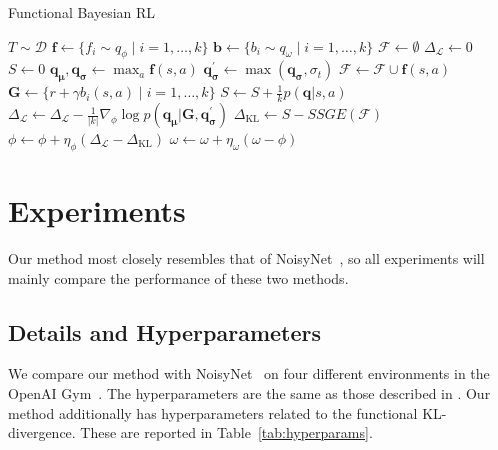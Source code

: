 \documentclass[]{uai2021} %
\newcommand{\D}{\mathcal{D}}
\newcommand{\f}{\mathbf{f}}
\newcommand{\KL}{\mathrm{KL}}
\begin{document}
\begin{algorithm}
\caption{Functional Bayesian RL}
\begin{algorithmic}
    \Function{UpdatePosterior}{$\phi, \omega, \D$}
        \State \(T \sim \D\)
        \State \(\f \gets \{f_i \sim q_\phi \mid i=1,\dots,k\}\)
        \State \(\mathbf{b} \gets \{b_i \sim q_\omega \mid i=1,\dots,k\}\)
        \State \(\mathcal{F} \gets \emptyset\)
        \State \(\Delta_\mathcal{L} \gets 0\)
        \State \(S \gets 0\)
            \State \(\bm{q_\mu}, \bm{q_\sigma} \gets \max_a \f(s,a)\)
            \State \(\bm{q_\sigma^\prime} \gets \max (\bm{q_\sigma}, \sigma_t)\)
            \State \(\mathcal{F} \gets \mathcal{F} \cup \f(s,a)\)
            \State \(\bm{G} \gets \{r + \gamma b_i(s,a) \mid i = 1, 
        \dots, k\}\)
            \State \(S \gets S + \frac{1}{k}p(\bm{q} \vert s, a)\)
            \State \(\Delta_\mathcal{L} \gets \Delta_\mathcal{L} - \frac{1}{\lvert k \rvert} \nabla_\phi \log p(\bm{q_\mu} \vert \bm{G}, \bm{q_\sigma^\prime})\)
        \EndFor
        \State \(\Delta_\KL \gets S - SSGE(\mathcal{F})\)
        \State \(\phi \gets \phi + \eta_\phi (\Delta_\mathcal{L} - \Delta_\KL)\)
        \State \(\omega \gets \omega + \eta_\omega (\omega - \phi)\)
    \EndFunction
\end{algorithmic}
\end{algorithm}

\section{Experiments}
Our method most closely resembles that of NoisyNet~\cite{fortunato_noisy_2019}, so
all experiments will mainly compare the performance of these two methods.

\subsection{Details and Hyperparameters}
We compare our method with NoisyNet~\citep{fortunato_noisy_2019} on four different
environments in the OpenAI Gym~\citep{brockman_openai_2016-2}. The hyperparameters
are the same as those described in \cite{han_nrowan-dqn_2020}. Our method additionally
has hyperparameters related to the functional KL-divergence. These are reported in
Table~\ref{tab:hyperparams}.
\end{document}
